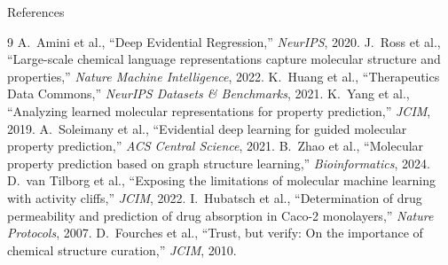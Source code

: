 \documentclass[aspectratio=169]{beamer}
\begin{document}
\begin{frame}[allowframebreaks]{References}
\footnotesize
\begin{thebibliography}{9}
 A.\ Amini et al., ``Deep Evidential Regression,'' \textit{NeurIPS}, 2020.
 J.\ Ross et al., ``Large-scale chemical language representations capture molecular structure and properties,'' \textit{Nature Machine Intelligence}, 2022.
 K.\ Huang et al., ``Therapeutics Data Commons,'' \textit{NeurIPS Datasets \& Benchmarks}, 2021.
 K.\ Yang et al., ``Analyzing learned molecular representations for property prediction,'' \textit{JCIM}, 2019.
 A.\ Soleimany et al., ``Evidential deep learning for guided molecular property prediction,'' \textit{ACS Central Science}, 2021.
 B.\ Zhao et al., ``Molecular property prediction based on graph structure learning,'' \textit{Bioinformatics}, 2024.
 D.\ van Tilborg et al., ``Exposing the limitations of molecular machine learning with activity cliffs,'' \textit{JCIM}, 2022.
 I.\ Hubatsch et al., ``Determination of drug permeability and prediction of drug absorption in Caco-2 monolayers,'' \textit{Nature Protocols}, 2007.
 D.\ Fourches et al., ``Trust, but verify: On the importance of chemical structure curation,'' \textit{JCIM}, 2010.
\end{thebibliography}
\end{frame}
\end{document}
